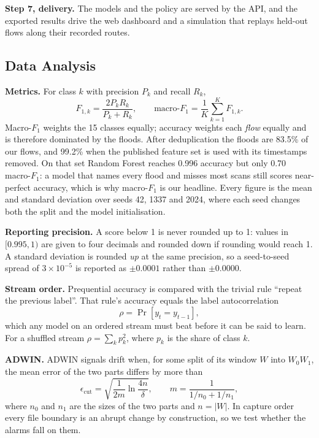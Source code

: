 \documentclass[preprint,12pt]{elsarticle}
\begin{document}
\textbf{Step 7, delivery.} The models and the policy are served by the API, and the exported results drive the web dashboard and a simulation that replays held-out flows along their recorded routes.

\subsection{Data Analysis}

\textbf{Metrics.} For class $k$ with precision $P_k$ and recall $R_k$,
\begin{equation}
F_{1,k} = \frac{2 P_k R_k}{P_k + R_k}, \qquad
\text{macro-}F_1 = \frac{1}{K} \sum_{k=1}^{K} F_{1,k}.
\label{eq:f1}
\end{equation}
Macro-$F_1$ weights the 15 classes equally; accuracy weights each \emph{flow} equally and is therefore dominated by the floods. After deduplication the floods are 83.5\% of our flows, and 99.2\% when the published feature set is used with its timestamps removed. On that set Random Forest reaches 0.996 accuracy but only 0.70 macro-$F_1$: a model that names every flood and misses most scans still scores near-perfect accuracy, which is why macro-$F_1$ is our headline. Every figure is the mean and standard deviation over seeds 42, 1337 and 2024, where each seed changes both the split and the model initialisation.

\textbf{Reporting precision.} A score below 1 is never rounded up to 1: values in $[0.995, 1)$ are given to four decimals and rounded down if rounding would reach 1. A standard deviation is rounded \emph{up} at the same precision, so a seed-to-seed spread of $3\times10^{-5}$ is reported as $\pm0.0001$ rather than $\pm0.0000$.

\textbf{Stream order.} Prequential accuracy is compared with the trivial rule ``repeat the previous label''. That rule's accuracy equals the label autocorrelation
\begin{equation}
\rho = \Pr\left[y_t = y_{t-1}\right],
\label{eq:rho}
\end{equation}
which any model on an ordered stream must beat before it can be said to learn. For a shuffled stream $\rho = \sum_k p_k^2$, where $p_k$ is the share of class $k$.

\textbf{ADWIN.} ADWIN signals drift when, for some split of its window $W$ into $W_0 W_1$, the mean error of the two parts differs by more than
\begin{equation}
\epsilon_{\text{cut}} = \sqrt{\frac{1}{2m}\ln\frac{4n}{\delta}}, \qquad m = \frac{1}{1/n_0 + 1/n_1},
\label{eq:adwin}
\end{equation}
where $n_0$ and $n_1$ are the sizes of the two parts and $n = |W|$. In capture order every file boundary is an abrupt change by construction, so we test whether the alarms fall on them.
\end{document}
